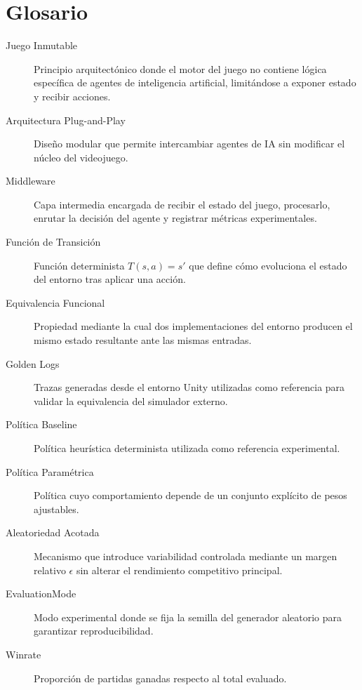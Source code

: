 \chapter*{Glosario}

\begin{description}
\item[Juego Inmutable] Principio arquitectónico donde el motor del juego no contiene lógica específica de agentes de inteligencia artificial, limitándose a exponer estado y recibir acciones.

\item[Arquitectura Plug-and-Play] Diseño modular que permite intercambiar agentes de IA sin modificar el núcleo del videojuego.

\item[Middleware] Capa intermedia encargada de recibir el estado del juego, procesarlo, enrutar la decisión del agente y registrar métricas experimentales.

\item[Función de Transición] Función determinista $T(s,a)=s'$ que define cómo evoluciona el estado del entorno tras aplicar una acción.

\item[Equivalencia Funcional] Propiedad mediante la cual dos implementaciones del entorno producen el mismo estado resultante ante las mismas entradas.

\item[Golden Logs] Trazas generadas desde el entorno Unity utilizadas como referencia para validar la equivalencia del simulador externo.

\item[Política Baseline] Política heurística determinista utilizada como referencia experimental.

\item[Política Paramétrica] Política cuyo comportamiento depende de un conjunto explícito de pesos ajustables.

\item[Aleatoriedad Acotada] Mecanismo que introduce variabilidad controlada mediante un margen relativo $\epsilon$ sin alterar el rendimiento competitivo principal.

\item[EvaluationMode] Modo experimental donde se fija la semilla del generador aleatorio para garantizar reproducibilidad.

\item[Winrate] Proporción de partidas ganadas respecto al total evaluado.


\end{description}
